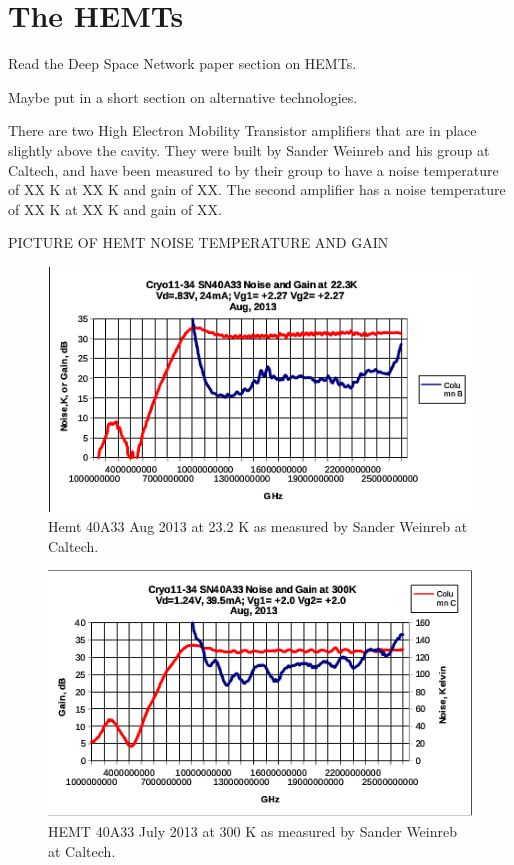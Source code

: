 \documentclass[11pt]{article}
\begin{document}
\section{The HEMTs}

Read the Deep Space Network paper section on HEMTs.

Maybe put in a short section on alternative technologies.

There are two High Electron Mobility Transistor amplifiers that are in place slightly above the cavity. They were built by Sander Weinreb and his group at Caltech, and have been measured to by their group to have a noise temperature of XX K at XX K and gain of XX. The second amplifier has a noise temperature of XX  K at XX K and gain of XX.

PICTURE OF HEMT NOISE TEMPERATURE AND GAIN
\begin{figure}
\includegraphics[scale=0.9]{hemt1afterrepairaug}
\caption{Hemt 40A33 Aug 2013 at 23.2 K as measured by Sander Weinreb at Caltech.}
\end{figure}

\begin{figure}
\includegraphics[scale=0.9]{hemt1afterrepairwarm}
\caption{HEMT 40A33 July 2013 at 300 K as measured by Sander Weinreb at Caltech.}
\end{figure}
\end{document}
